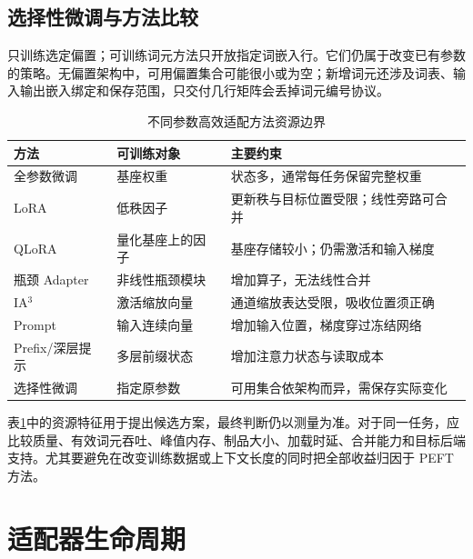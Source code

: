 \documentclass[../textbook.tex]{subfiles}
\begin{document}
\subsection{选择性微调与方法比较}
只训练选定偏置\cite{zaken2022bitfit}；可训练词元方法只开放指定词嵌入行。它们仍属于改变已有参数的策略。无偏置架构中，可用偏置集合可能很小或为空；新增词元还涉及词表、输入输出嵌入绑定和保存范围，只交付几行矩阵会丢掉词元编号协议。

\begin{table}[htbp]
\centering
\caption{不同参数高效适配方法资源边界}
\label{tab:peft-method-comparison}
\begin{tabularx}{\linewidth}{@{}p{2.2cm}p{3.2cm}X@{}}
\toprule
方法 & 可训练对象 & 主要约束\\
\midrule
全参数微调 & 基座权重 & 状态多，通常每任务保留完整权重\\
LoRA & 低秩因子 & 更新秩与目标位置受限；线性旁路可合并\\
QLoRA & 量化基座上的因子 & 基座存储较小；仍需激活和输入梯度\\
瓶颈 Adapter & 非线性瓶颈模块 & 增加算子，无法线性合并\\
IA$^3$ & 激活缩放向量 & 通道缩放表达受限，吸收位置须正确\\
Prompt & 输入连续向量 & 增加输入位置，梯度穿过冻结网络\\
Prefix/深层提示 & 多层前缀状态 & 增加注意力状态与读取成本\\
选择性微调 & 指定原参数 & 可用集合依架构而异，需保存实际变化\\
\bottomrule
\end{tabularx}
\end{table}

表\ref{tab:peft-method-comparison}中的资源特征用于提出候选方案，最终判断仍以测量为准。对于同一任务，应比较质量、有效词元吞吐、峰值内存、制品大小、加载时延、合并能力和目标后端支持。尤其要避免在改变训练数据或上下文长度的同时把全部收益归因于 PEFT 方法。

\section{适配器生命周期}
\end{document}
